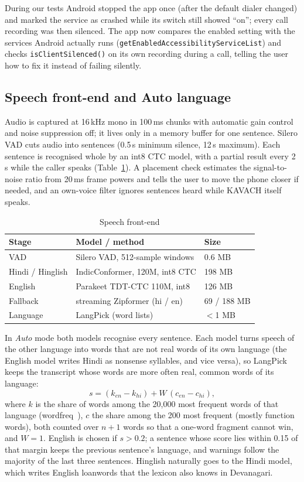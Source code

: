 \documentclass[conference]{IEEEtran}
\begin{document}
During our tests Android stopped the app once (after the default dialer changed) and marked the service as crashed while its switch still showed ``on''; every call recording was then silenced. The app now compares the enabled setting with the services Android actually runs (\texttt{getEnabledAccessibilityServiceList}) and checks \texttt{isClientSilenced()} on its own recording during a call, telling the user how to fix it instead of failing silently.

\subsection{Speech front-end and Auto language}\label{sec:speech}
Audio is captured at 16\,kHz mono in 100\,ms chunks with automatic gain control and noise suppression off; it lives only in a memory buffer for one sentence. Silero VAD cuts audio into sentences (0.5\,s minimum silence, 12\,s maximum). Each sentence is recognised whole by an int8 CTC model, with a partial result every 2\,s while the caller speaks (Table~\ref{tab:frontend}). A placement check estimates the signal-to-noise ratio from 20\,ms frame powers and tells the user to move the phone closer if needed, and an own-voice filter ignores sentences heard while KAVACH itself speaks.

\begin{table}[t]
\caption{Speech front-end}
\label{tab:frontend}
\centering
\footnotesize
\setlength{\tabcolsep}{3pt}
\begin{tabular}{@{}lll@{}}
\toprule
Stage & Model / method & Size \\
\midrule
VAD & Silero VAD, 512-sample windows & 0.6 MB \\
Hindi / Hinglish & IndicConformer, 120M, int8 CTC & 198 MB \\
English & Parakeet TDT-CTC 110M, int8 & 126 MB \\
Fallback & streaming Zipformer (hi / en) & 69 / 188 MB \\
Language & LangPick (word lists) & $<$1 MB \\
\bottomrule
\end{tabular}
\end{table}

In \emph{Auto} mode both models recognise every sentence. Each model turns speech of the other language into words that are not real words of its own language (the English model writes Hindi as nonsense syllables, and vice versa), so LangPick keeps the transcript whose words are more often real, common words of its language:
\begin{equation}
s = (k_{en} - k_{hi}) + W\,(c_{en} - c_{hi}),
\end{equation}
where $k$ is the share of words among the 20,000 most frequent words of that language (wordfreq~\cite{wordfreq}), $c$ the share among the 200 most frequent (mostly function words), both counted over $n{+}1$ words so that a one-word fragment cannot win, and $W{=}1$. English is chosen if $s>0.2$; a sentence whose score lies within 0.15 of that margin keeps the previous sentence's language, and warnings follow the majority of the last three sentences. Hinglish naturally goes to the Hindi model, which writes English loanwords that the lexicon also knows in Devanagari.
\end{document}
